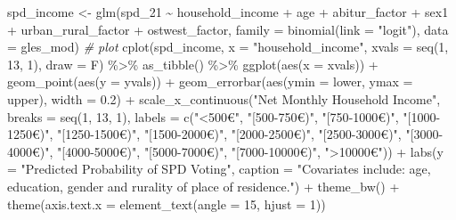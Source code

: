 \documentclass[
]{article}
\newenvironment{Shaded}{\begin{snugshade}}{\end{snugshade}}
\newcommand{\AttributeTok}[1]{\textcolor[rgb]{0.77,0.63,0.00}{#1}}
\newcommand{\CommentTok}[1]{\textcolor[rgb]{0.56,0.35,0.01}{\textit{#1}}}
\newcommand{\DecValTok}[1]{\textcolor[rgb]{0.00,0.00,0.81}{#1}}
\newcommand{\FloatTok}[1]{\textcolor[rgb]{0.00,0.00,0.81}{#1}}
\newcommand{\FunctionTok}[1]{\textcolor[rgb]{0.00,0.00,0.00}{#1}}
\newcommand{\NormalTok}[1]{#1}
\newcommand{\OtherTok}[1]{\textcolor[rgb]{0.56,0.35,0.01}{#1}}
\newcommand{\SpecialCharTok}[1]{\textcolor[rgb]{0.00,0.00,0.00}{#1}}
\newcommand{\StringTok}[1]{\textcolor[rgb]{0.31,0.60,0.02}{#1}}
\begin{document}
\begin{Shaded}
\begin{Highlighting}[]
\NormalTok{spd\_income }\OtherTok{\textless{}{-}} \FunctionTok{glm}\NormalTok{(spd\_21 }\SpecialCharTok{\textasciitilde{}}\NormalTok{ household\_income }\SpecialCharTok{+}\NormalTok{ age }\SpecialCharTok{+}\NormalTok{ abitur\_factor }\SpecialCharTok{+}\NormalTok{ sex1 }\SpecialCharTok{+}\NormalTok{ urban\_rural\_factor }\SpecialCharTok{+}\NormalTok{ ostwest\_factor, }
                  \AttributeTok{family =} \FunctionTok{binomial}\NormalTok{(}\AttributeTok{link =} \StringTok{"logit"}\NormalTok{), }
                  \AttributeTok{data =}\NormalTok{ gles\_mod)}
\CommentTok{\# plot }
\FunctionTok{cplot}\NormalTok{(spd\_income, }\AttributeTok{x =} \StringTok{"household\_income"}\NormalTok{,}
      \AttributeTok{xvals =} \FunctionTok{seq}\NormalTok{(}\DecValTok{1}\NormalTok{, }\DecValTok{13}\NormalTok{, }\DecValTok{1}\NormalTok{), }\AttributeTok{draw =}\NormalTok{ F) }\SpecialCharTok{\%\textgreater{}\%}
  \FunctionTok{as\_tibble}\NormalTok{() }\SpecialCharTok{\%\textgreater{}\%}
  \FunctionTok{ggplot}\NormalTok{(}\FunctionTok{aes}\NormalTok{(}\AttributeTok{x =}\NormalTok{ xvals)) }\SpecialCharTok{+}
  \FunctionTok{geom\_point}\NormalTok{(}\FunctionTok{aes}\NormalTok{(}\AttributeTok{y =}\NormalTok{ yvals)) }\SpecialCharTok{+}
  \FunctionTok{geom\_errorbar}\NormalTok{(}\FunctionTok{aes}\NormalTok{(}\AttributeTok{ymin =}\NormalTok{ lower, }\AttributeTok{ymax =}\NormalTok{ upper), }\AttributeTok{width =} \FloatTok{0.2}\NormalTok{) }\SpecialCharTok{+}
  \FunctionTok{scale\_x\_continuous}\NormalTok{(}\StringTok{"Net Monthly Household Income"}\NormalTok{,}
                     \AttributeTok{breaks =} \FunctionTok{seq}\NormalTok{(}\DecValTok{1}\NormalTok{, }\DecValTok{13}\NormalTok{, }\DecValTok{1}\NormalTok{),}
                     \AttributeTok{labels =} \FunctionTok{c}\NormalTok{(}\StringTok{"\textless{}500€"}\NormalTok{, }\StringTok{"[500{-}750€)"}\NormalTok{,}
                                \StringTok{"[750{-}1000€)"}\NormalTok{, }\StringTok{"[1000{-}1250€)"}\NormalTok{, }
                                \StringTok{"[1250{-}1500€)"}\NormalTok{, }\StringTok{"[1500{-}2000€)"}\NormalTok{,}
                                \StringTok{"[2000{-}2500€)"}\NormalTok{, }\StringTok{"[2500{-}3000€)"}\NormalTok{,}
                                \StringTok{"[3000{-}4000€)"}\NormalTok{, }\StringTok{"[4000{-}5000€)"}\NormalTok{,}
                                \StringTok{"[5000{-}7000€)"}\NormalTok{, }\StringTok{"[7000{-}10000€)"}\NormalTok{,}
                                \StringTok{"\textgreater{}10000€"}\NormalTok{)) }\SpecialCharTok{+}
  \FunctionTok{labs}\NormalTok{(}\AttributeTok{y =} \StringTok{"Predicted Probability of SPD Voting"}\NormalTok{,}
       \AttributeTok{caption =} \StringTok{"Covariates include: age, education, gender and rurality of place of residence."}\NormalTok{) }\SpecialCharTok{+}
  \FunctionTok{theme\_bw}\NormalTok{() }\SpecialCharTok{+}
  \FunctionTok{theme}\NormalTok{(}\AttributeTok{axis.text.x =} \FunctionTok{element\_text}\NormalTok{(}\AttributeTok{angle =} \DecValTok{15}\NormalTok{, }\AttributeTok{hjust =} \DecValTok{1}\NormalTok{))}
\end{Highlighting}
\end{Shaded}
\end{document}
